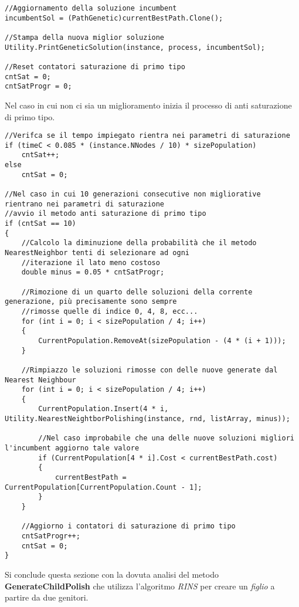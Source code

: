 \documentclass[11pt]{article}
\begin{document}
\begin{lstlisting} 
//Aggiornamento della soluzione incumbent
incumbentSol = (PathGenetic)currentBestPath.Clone();

//Stampa della nuova miglior soluzione
Utility.PrintGeneticSolution(instance, process, incumbentSol);

//Reset contatori saturazione di primo tipo
cntSat = 0;
cntSatProgr = 0;
\end{lstlisting}

Nel caso in cui non ci sia un miglioramento inizia il processo di anti saturazione di primo tipo.

\begin{lstlisting}
//Verifca se il tempo impiegato rientra nei parametri di saturazione
if (timeC < 0.085 * (instance.NNodes / 10) * sizePopulation)
    cntSat++;
else
    cntSat = 0;

//Nel caso in cui 10 generazioni consecutive non migliorative rientrano nei parametri di saturazione
//avvio il metodo anti saturazione di primo tipo
if (cntSat == 10)
{
    //Calcolo la diminuzione della probabilità che il metodo NearestNeighbor tenti di selezionare ad ogni
    //iterazione il lato meno costoso
    double minus = 0.05 * cntSatProgr;

    //Rimozione di un quarto delle soluzioni della corrente generazione, più precisamente sono sempre
    //rimosse quelle di indice 0, 4, 8, ecc...
    for (int i = 0; i < sizePopulation / 4; i++)
    {
        CurrentPopulation.RemoveAt(sizePopulation - (4 * (i + 1)));
    }

    //Rimpiazzo le soluzioni rimosse con delle nuove generate dal Nearest Neighbour
    for (int i = 0; i < sizePopulation / 4; i++)
    {
        CurrentPopulation.Insert(4 * i, Utility.NearestNeightborPolishing(instance, rnd, listArray, minus));
        
        //Nel caso improbabile che una delle nuove soluzioni migliori l'incumbent aggiorno tale valore
        if (CurrentPopulation[4 * i].Cost < currentBestPath.cost)
        {
            currentBestPath = CurrentPopulation[CurrentPopulation.Count - 1];
        }
    }

    //Aggiorno i contatori di saturazione di primo tipo
    cntSatProgr++;
    cntSat = 0;
}
\end{lstlisting}

Si conclude questa sezione con la dovuta analisi del metodo \textbf{GenerateChildPolish} che utilizza l'algoritmo \textit{RINS} per creare un \textit{figlio} a partire da due genitori.
\end{document}
